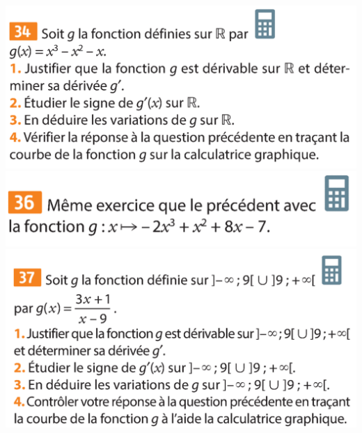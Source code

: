\documentclass{article}
\begin{document}
\begin{center}
\begin{minipage}{0.45\textwidth}
\includegraphics[width=\textwidth]{Exercice_4.png}
\includegraphics[width=\textwidth]{Exercice_5.png}
\includegraphics[width=\textwidth]{Exercice_6.png}
\end{minipage}
\end{center}
\end{document}
